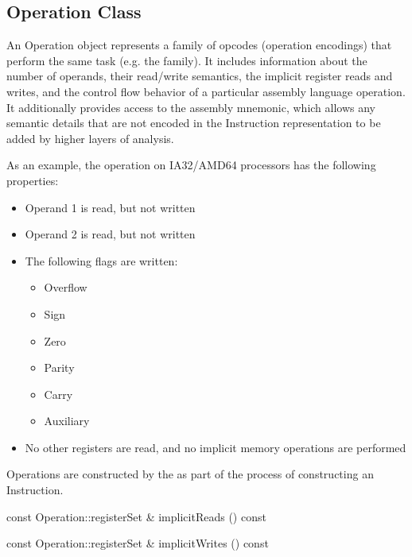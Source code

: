 \subsection{Operation Class}
\label{sec:operation}

An Operation object represents a family of opcodes (operation encodings) that
perform the same task (e.g. the  family). It includes information
about the number of operands, their read/write semantics, the implicit register
reads and writes, and the control flow behavior of a particular assembly
language operation. It additionally provides access to the assembly mnemonic,
which allows any semantic details that are not encoded in the Instruction
representation to be added by higher layers of analysis.

As an example, the  operation on IA32/AMD64 processors has the following properties:
\begin{itemize}
\item Operand 1 is read, but not written
\item Operand 2 is read, but not written
\item The following flags are written:
\begin{itemize}
\item Overflow
\item Sign
\item Zero
\item Parity
\item Carry
\item Auxiliary
\end{itemize}
\item No other registers are read, and no implicit memory operations are performed
\end{itemize}

Operations are constructed by the  as part of the
process of constructing an Instruction. 

\begin{apient}
const Operation::registerSet & implicitReads () const
\end{apient}

\begin{apient}
const Operation::registerSet & implicitWrites () const
\end{apient}


